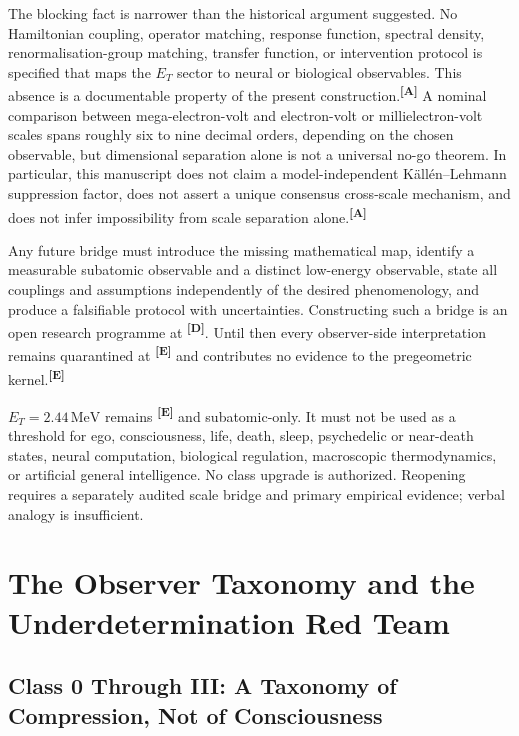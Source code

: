 \documentclass[12pt,a4paper,twoside]{article}
\theoremstyle{plain}
\theoremstyle{definition}
\theoremstyle{remark}
\newcommand{\MeV}{\,\mathrm{MeV}}
\newcommand{\catmark}[1]{\textsuperscript{\textsf{\textbf{[#1]}}}}
\newcommand{\ETorsion}{2.44\MeV} %
\begin{document}
The blocking fact is narrower than the historical argument suggested. No
Hamiltonian coupling, operator matching, response function, spectral density,
renormalisation-group matching, transfer function, or intervention protocol is
specified that maps the $E_T$ sector to neural or biological observables. This
absence is a documentable property of the present construction.\catmark{A}
A nominal comparison between mega-electron-volt and electron-volt or
millielectron-volt scales spans roughly six to nine decimal orders, depending
on the chosen observable, but dimensional separation alone is not a universal
no-go theorem. In particular, this manuscript does not claim a model-independent
K\"all\'en--Lehmann suppression factor, does not assert a unique consensus
cross-scale mechanism, and does not infer impossibility from scale separation
alone.\catmark{A}

Any future bridge must introduce the missing mathematical map, identify a
measurable subatomic observable and a distinct low-energy observable, state
all couplings and assumptions independently of the desired phenomenology, and
produce a falsifiable protocol with uncertainties. Constructing such a bridge
is an open research programme at \catmark{D}. Until then every observer-side
interpretation remains quarantined at \catmark{E} and contributes no evidence
to the pregeometric kernel.\catmark{E}

\begin{governancebox}
$E_T=\ETorsion$ remains \catmark{E} and subatomic-only. It must not be used as
a threshold for ego, consciousness, life, death, sleep, psychedelic or
near-death states, neural computation, biological regulation, macroscopic
thermodynamics, or artificial general intelligence. No class upgrade is
authorized. Reopening requires a separately audited scale bridge and primary
empirical evidence; verbal analogy is insufficient.
\end{governancebox}

\newpage
\section{The Observer Taxonomy and the Underdetermination Red Team}
\label{sec:observer-taxonomy-underdetermination}

\subsection{Class 0 Through III: A Taxonomy of Compression, Not of Consciousness}
\label{subsec:observer-taxonomy}
\end{document}
